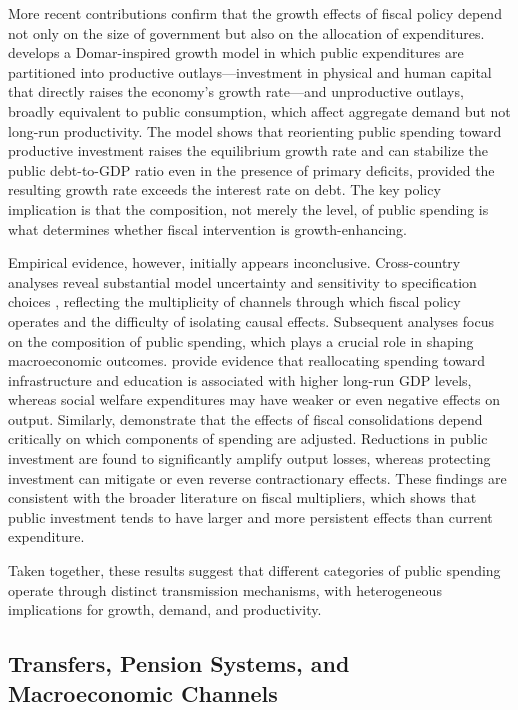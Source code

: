 \documentclass[11pt,english,a4paper, twoside, authoryear]{article}
\begin{document}
More recent contributions confirm that the growth effects of fiscal policy depend not only on the size of government but also on the allocation of expenditures. \citet{Sardoni2024} develops a Domar-inspired growth model in which public expenditures are partitioned into productive outlays---investment in physical and human capital that directly raises the economy's growth rate---and unproductive outlays, broadly equivalent to public consumption, which affect aggregate demand but not long-run productivity. The model shows that reorienting public spending toward productive investment raises the equilibrium growth rate and can stabilize the public debt-to-GDP ratio even in the presence of primary deficits, provided the resulting growth rate exceeds the interest rate on debt. The key policy implication is that the composition, not merely the level, of public spending is what determines whether fiscal intervention is growth-enhancing.

Empirical evidence, however, initially appears inconclusive. Cross-country analyses reveal substantial model uncertainty and sensitivity to specification choices \citep{MoralBenito2012}, reflecting the multiplicity of channels through which fiscal policy operates and the difficulty of isolating causal effects. Subsequent analyses focus on the composition of public spending, which plays a crucial role in shaping macroeconomic outcomes. \citet{Gemmell2016} provide evidence that reallocating spending toward infrastructure and education is associated with higher long-run GDP levels, whereas social welfare expenditures may have weaker or even negative effects on output. Similarly, \citet{Ardanaz2021} demonstrate that the effects of fiscal consolidations depend critically on which components of spending are adjusted. Reductions in public investment are found to significantly amplify output losses, whereas protecting investment can mitigate or even reverse contractionary effects. These findings are consistent with the broader literature on fiscal multipliers, which shows that public investment tends to have larger and more persistent effects than current expenditure.

Taken together, these results suggest that different categories of public spending operate through distinct transmission mechanisms, with heterogeneous implications for growth, demand, and productivity.

\subsection{Transfers, Pension Systems, and Macroeconomic Channels}
\end{document}
